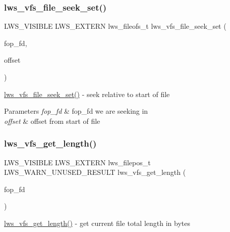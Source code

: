\subsubsection{\texorpdfstring{lws\+\_\+vfs\+\_\+file\+\_\+seek\+\_\+set()}{lws\_vfs\_file\_seek\_set()}}
{\footnotesize\ttfamily L\+W\+S\+\_\+\+V\+I\+S\+I\+B\+LE L\+W\+S\+\_\+\+E\+X\+T\+E\+RN lws\+\_\+fileofs\+\_\+t lws\+\_\+vfs\+\_\+file\+\_\+seek\+\_\+set (\begin{DoxyParamCaption}\item[{\hyperlink{structlws__fop__fd}{lws\+\_\+fop\+\_\+fd\+\_\+t}}]{fop\+\_\+fd,  }\item[{lws\+\_\+fileofs\+\_\+t}]{offset }\end{DoxyParamCaption})}

\hyperlink{group__fops_ga23eb98c37dd3df5c97115ea469c6a89b}{lws\+\_\+vfs\+\_\+file\+\_\+seek\+\_\+set()} -\/ seek relative to start of file


\begin{DoxyParams}{Parameters}
{\em fop\+\_\+fd} & fop\+\_\+fd we are seeking in \\
\hline
{\em offset} & offset from start of file \\
\hline
\end{DoxyParams}
\mbox{\label{group__fops_gac858c510999bf0779d10668d2617a445}} 
\subsubsection{\texorpdfstring{lws\+\_\+vfs\+\_\+get\+\_\+length()}{lws\_vfs\_get\_length()}}
{\footnotesize\ttfamily L\+W\+S\+\_\+\+V\+I\+S\+I\+B\+LE L\+W\+S\+\_\+\+E\+X\+T\+E\+RN lws\+\_\+filepos\+\_\+t L\+W\+S\+\_\+\+W\+A\+R\+N\+\_\+\+U\+N\+U\+S\+E\+D\+\_\+\+R\+E\+S\+U\+LT lws\+\_\+vfs\+\_\+get\+\_\+length (\begin{DoxyParamCaption}\item[{\hyperlink{structlws__fop__fd}{lws\+\_\+fop\+\_\+fd\+\_\+t}}]{fop\+\_\+fd }\end{DoxyParamCaption})}

\hyperlink{group__fops_gac858c510999bf0779d10668d2617a445}{lws\+\_\+vfs\+\_\+get\+\_\+length()} -\/ get current file total length in bytes


